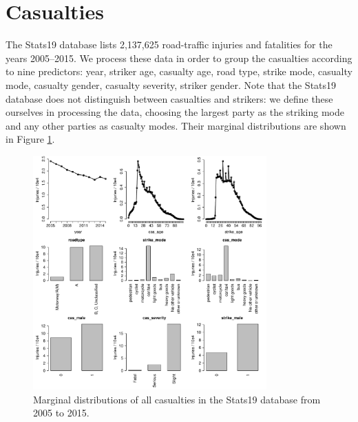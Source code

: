 \documentclass{article}
\begin{document}


\section{Casualties}\label{injuries}

The Stats19 database lists 2,137,625 road-traffic injuries and fatalities for the years 2005--2015. We process these data in order to group the casualties according to nine predictors: year, striker age, casualty age, road type, strike mode, casualty mode, casualty gender, casualty severity, striker gender. Note that the Stats19 database does not distinguish between casualties and strikers: we define these ourselves in processing the data, choosing the largest party as the striking mode and any other parties as casualty modes. Their marginal distributions are shown in Figure \ref{descriptive}.

\begin{figure}[H]
\centering
\includegraphics[width=0.8\textwidth]{descriptive.pdf}
\caption{\small Marginal distributions of all casualties in the Stats19 database from 2005 to 2015.}
\label{descriptive}
\end{figure}
\end{document}
